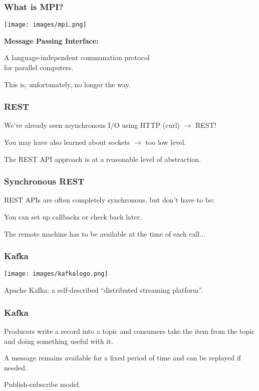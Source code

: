 \begin{frame}
  \frametitle{What is MPI?}

\begin{center}
	\texttt{[image: images/mpi.png]}
\end{center}
  {\bf Message Passing Interface:}

  A language-independent communation protocol\\ for parallel computers.

This is, unfortunately, no longer the way. 
  
\end{frame}




\begin{frame}
\frametitle{REST}

We've already seen asynchronous I/O using HTTP (curl) $\rightarrow$ REST!

You may have also learned about sockets $\rightarrow$ too low level.

The REST API approach is at a reasonable level of abstraction. 

\end{frame}


\begin{frame}
\frametitle{Synchronous REST}

REST APIs are often completely synchronous, but don't have to be:

You can set up  callbacks or check back later.

The remote machine has to be available at the time of each call...

\end{frame}


\begin{frame}
\frametitle{Kafka}

\begin{center}
	\texttt{[image: images/kafkalogo.png]}
\end{center}


Apache Kafka: a self-described ``distributed streaming platform''.

\end{frame}


\begin{frame}
\frametitle{Kafka}

Producers write a record into a topic and consumers take the item from the topic and doing something useful with it.

A message remains available for a fixed period of time and can be replayed if needed.

Publish-subscribe model.

\end{frame}



